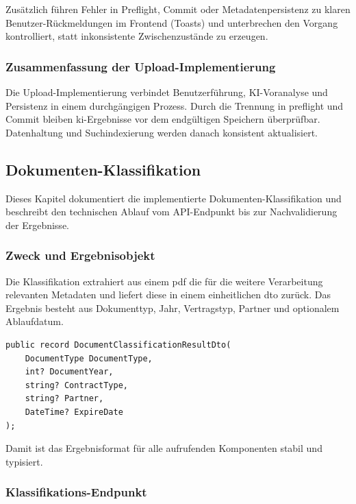 Zusätzlich führen Fehler in Preflight, Commit oder Metadatenpersistenz zu klaren Benutzer-Rückmeldungen im Frontend (Toasts) und unterbrechen den Vorgang kontrolliert, statt inkonsistente Zwischenzustände zu erzeugen.

\subsubsection{Zusammenfassung der Upload-Implementierung}

Die Upload-Implementierung verbindet Benutzerführung, KI-Voranalyse und Persistenz in einem durchgängigen Prozess.
Durch die Trennung in \gls{preflight} und Commit bleiben \gls{ki}-Ergebnisse vor dem endgültigen Speichern überprüfbar. Datenhaltung und Suchindexierung werden danach konsistent aktualisiert.

\subsection{Dokumenten-Klassifikation}\label{subsec:dokumenten_klassifikation}

Dieses Kapitel dokumentiert die implementierte Dokumenten-Klassifikation und beschreibt den technischen Ablauf vom API-Endpunkt bis zur Nachvalidierung der Ergebnisse.

\subsubsection{Zweck und Ergebnisobjekt}

Die Klassifikation extrahiert aus einem \acrshort{pdf} die für die weitere Verarbeitung relevanten Metadaten und liefert diese in einem einheitlichen \acrshort{dto} zurück. Das Ergebnis besteht aus Dokumenttyp, Jahr, Vertragstyp, Partner und optionalem Ablaufdatum.

\begin{lstlisting}[language={[Sharp]C},caption={Rückgabeobjekt der Klassifikation},label={lst:classification-result-dto}]
public record DocumentClassificationResultDto(
    DocumentType DocumentType,
    int? DocumentYear,
    string? ContractType,
    string? Partner,
    DateTime? ExpireDate
);
\end{lstlisting}

Damit ist das Ergebnisformat für alle aufrufenden Komponenten stabil und typisiert.

\subsubsection{Klassifikations-Endpunkt}

